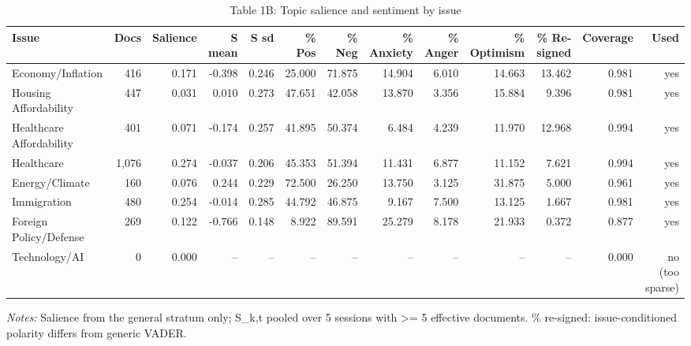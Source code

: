 \begin{table}[htbp]
\centering
\caption{Table 1B: Topic salience and sentiment by issue}
\label{tab:table1b_issue_sentiment}
\small
\begin{tabular}{lrrrrrrrrrrrr}
\toprule
Issue & Docs & Salience & S mean & S sd & \% Pos & \% Neg & \% Anxiety & \% Anger & \% Optimism & \% Re-signed & Coverage & Used \\
\midrule
Economy/Inflation & 416 & 0.171 & -0.398 & 0.246 & 25.000 & 71.875 & 14.904 & 6.010 & 14.663 & 13.462 & 0.981 & yes \\
Housing Affordability & 447 & 0.031 & 0.010 & 0.273 & 47.651 & 42.058 & 13.870 & 3.356 & 15.884 & 9.396 & 0.981 & yes \\
Healthcare Affordability & 401 & 0.071 & -0.174 & 0.257 & 41.895 & 50.374 & 6.484 & 4.239 & 11.970 & 12.968 & 0.994 & yes \\
Healthcare & 1,076 & 0.274 & -0.037 & 0.206 & 45.353 & 51.394 & 11.431 & 6.877 & 11.152 & 7.621 & 0.994 & yes \\
Energy/Climate & 160 & 0.076 & 0.244 & 0.229 & 72.500 & 26.250 & 13.750 & 3.125 & 31.875 & 5.000 & 0.961 & yes \\
Immigration & 480 & 0.254 & -0.014 & 0.285 & 44.792 & 46.875 & 9.167 & 7.500 & 13.125 & 1.667 & 0.981 & yes \\
Foreign Policy/Defense & 269 & 0.122 & -0.766 & 0.148 & 8.922 & 89.591 & 25.279 & 8.178 & 21.933 & 0.372 & 0.877 & yes \\
Technology/AI & 0 & 0.000 & – & – & – & – & – & – & – & – & 0.000 & no (too sparse) \\
\bottomrule
\end{tabular}
\par\smallskip\footnotesize\emph{Notes:} Salience from the general stratum only; S\_k,t pooled over 5 sessions with >= 5 effective documents. \% re-signed: issue-conditioned polarity differs from generic VADER.
\end{table}